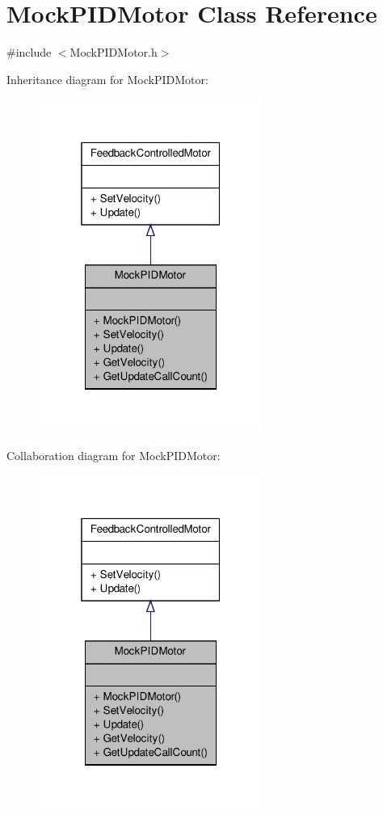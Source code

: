 \hypertarget{class_mock_p_i_d_motor}{\section{Mock\-P\-I\-D\-Motor Class Reference}
\label{class_mock_p_i_d_motor}
}


{\ttfamily \#include $<$Mock\-P\-I\-D\-Motor.\-h$>$}



Inheritance diagram for Mock\-P\-I\-D\-Motor\-:
\nopagebreak
\begin{figure}[H]
\begin{center}
\leavevmode
\includegraphics[width=208pt]{class_mock_p_i_d_motor__inherit__graph}
\end{center}
\end{figure}


Collaboration diagram for Mock\-P\-I\-D\-Motor\-:
\nopagebreak
\begin{figure}[H]
\begin{center}
\leavevmode
\includegraphics[width=208pt]{class_mock_p_i_d_motor__coll__graph}
\end{center}
\end{figure}
